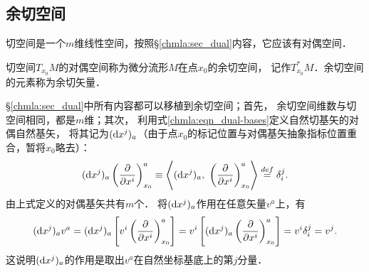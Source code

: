 \subsection{余切空间}
切空间是一个$m$维线性空间，按照\S\ref{chmla:sec_dual}内容，它应该有对偶空间．
\begin{definition}
    切空间$T_{x_0}M$的对偶空间称为微分流形$M$在点$x_0$的{\heiti 余切空间}，
    记作$T_{x_0}^{*}M$．余切空间的元素称为{\heiti 余切矢量}．
\end{definition}
\S\ref{chmla:sec_dual}中所有内容都可以移植到余切空间；首先，
余切空间维数与切空间相同，都是$m$维；其次，
利用式\eqref{chmla:eqn_dual-bases}定义自然切基矢的{\heiti 对偶自然基矢}，
将其记为$({\rm d}x^j)_a$（由于点${x_0}$的标记位置与对偶基矢抽象指标位置重合，暂将${x_0}$略去）：
\begin{equation}\label{chdm:eqn_dual-natural-bases}
    ({\rm d}x^j)_a \left(\frac{\partial }{\partial x^i}\right)^a_{x_0} \equiv 
    \left< ({\rm d}x^j)_a , \   \left(\frac{\partial }{\partial x^i}\right)^a_{x_0}\right>
    \overset{def}{=} \delta^j_i .
\end{equation}
由上式定义的对偶基矢共有$m$个．
将$({\rm d}x^j)_a$作用在任意矢量$v^a$上，有
\begin{equation*}
    ({\rm d}x^j)_a v^a =  ({\rm d}x^j)_a 
       \left[v^i \left(\frac{\partial }{\partial x^i}\right)^a_{x_0}\right] 
    =  v^i \left[ ({\rm d}x^j)_a  \left(\frac{\partial }{\partial x^i}\right)^a_{x_0}\right] 
    =  v^i \delta^j_i = v^j .
\end{equation*}
这说明$({\rm d}x^j)_a$的作用是取出$v^a$在自然坐标基底上的第$j$分量．

